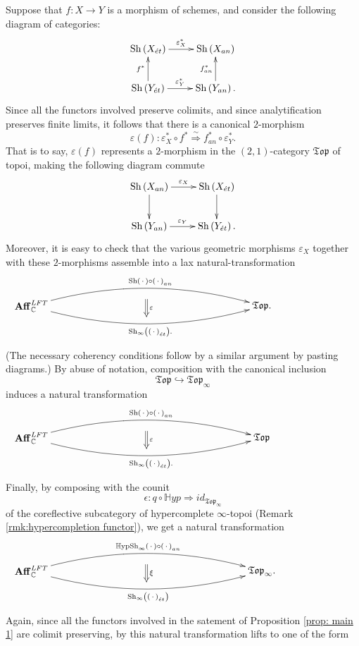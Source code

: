 \documentclass[12pt]{amsart}
\theoremstyle{definition}
\newcommand{\Aff}{\mathbf{Aff}^{\mathit{LFT}}_{\mathbb{C}}}
\newcommand{\Sh}{\operatorname{Sh}}
\newcommand{\et}{\acute{e}t}
\renewcommand{\i}{\infty}
\def\Shi{\Sh_\i}
\def\Hshi{\mathbb{H}\mathrm{ypSh}_\i}
\def\blank{\mspace{3mu}\cdot\mspace{3mu}}
\begin{document}
Suppose that $f:X \to Y$ is a morphism of schemes, and consider the following diagram of categories:
$$\xymatrix{\Sh\left(X_{\et}\right) \ar[r]^-{\varepsilon^*_X} & \Sh\left(X_{an}\right)\\
\Sh\left(Y_{\et}\right) \ar[u]^-{f^*} \ar[r]^-{\varepsilon^*_Y} & \Sh\left(Y_{an}\right) \ar[u]^-{f^*_{an}}.}$$
Since all the functors involved preserve colimits, and since analytification preserves finite limits, it follows that there is a canonical $2$-morphism $$\varepsilon\left(f\right):\varepsilon^*_X \circ f^* \stackrel{\sim}{\Rightarrow} f^*_{an} \circ \varepsilon^*_Y.$$ That is to say, $\varepsilon\left(f\right)$ represents a $2$-morphism in the $\left(2,1\right)$-category $\mathfrak{Top}$ of topoi, making the following diagram commute
$$\xymatrix{\Sh\left(X_{an}\right) \ar[d] \ar[r]^-{\varepsilon_X} & \Sh\left(X_{\et}\right) \ar[d]\\
\Sh\left(Y_{an}\right)  \ar[r]^-{\varepsilon_Y} & \Sh\left(Y_{\et}\right).}$$
Moreover, it is easy to check that the various geometric morphisms $\varepsilon_X$ together with these $2$-morphisms assemble into a lax natural-transformation
$$ \xygraph{!{0;(6.5,0):(0,0.15)::}
{\Aff}="a" [r] {\mathfrak{Top}.}="b"
"a":@/^{1.5pc}/"b"^-{\Sh\left(\blank\right)\circ \left(\blank\right)_{an}}|(.4){}="l"
"a":@/_{1.5pc}/"b"_-{\Shi\left(\left(\blank\right)_{\et}\right).}
"l" [d(.3)]  [r(0.1)] :@{=>}^{\varepsilon} [d(.5)]} $$
(The necessary coherency conditions follow by a similar argument by pasting diagrams.)
By abuse of notation, composition with the canonical inclusion $$\mathfrak{Top} \hookrightarrow \mathfrak{Top}_\i$$ induces a natural transformation
$$ \xygraph{!{0;(6.5,0):(0,0.15)::}
{\Aff}="a" [r] {\mathfrak{Top}}="b"
"a":@/^{1.5pc}/"b"^-{\Sh\left(\blank\right)\circ \left(\blank\right)_{an}}|(.4){}="l"
"a":@/_{1.5pc}/"b"_-{\Shi\left(\left(\blank\right)_{\et}\right).}
"l" [d(.3)]  [r(0.1)] :@{=>}^{\varepsilon} [d(.5)]} $$
Finally, by composing with the counit $$\epsilon: q \circ \mathbb{H}yp \Rightarrow id_{\mathfrak{Top}_\i}$$ of the coreflective subcategory of hypercomplete $\i$-topoi (Remark \ref{rmk:hypercompletion functor}), we get a natural transformation
$$ \xygraph{!{0;(6.5,0):(0,0.15)::}
{\Aff}="a" [r] {\mathfrak{Top}_\i.}="b"
"a":@/^{1.5pc}/"b"^-{\Hshi\left(\blank\right)\circ \left(\blank\right)_{an}}|(.4){}="l"
"a":@/_{1.5pc}/"b"_-{\Shi\left(\left(\blank\right)_{\et}\right)}
"l" [d(.3)]  [r(0.1)] :@{=>}^{\xi} [d(.5)]} $$
Again, since all the functors involved in the satement of Proposition \ref{prop: main 1} are colimit preserving, by \cite[Proposition 5.5.4.20, Theorem 5.1.5.6]{htt} this natural transformation lifts to one of the form
\end{document}

